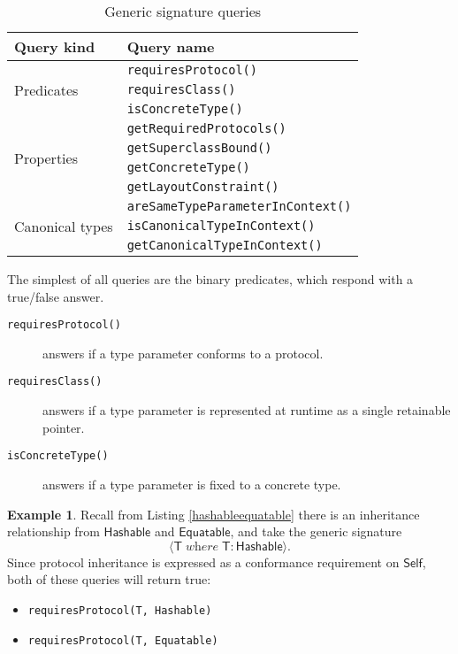 \documentclass[headsepline,bibliography=totoc]{scrreport}
\newcommand{\genericparam}[1]{\bm{\mathsf{#1}}}
\newcommand{\proto}[1]{\bm{\mathsf{#1}}}
\newcommand{\gensig}[2]{\langle #1\;\textit{where}\;#2\rangle}
\theoremstyle{definition}
\newtheorem{example}{Example}[chapter]
\theoremstyle{definition}
\theoremstyle{definition}
\begin{document}
\begin{table}\caption{Generic signature queries}\label{querytable}
\begin{center}
\begin{tabular}{|l|l|}
\hline
Query kind&Query name\\
\hline
\hline
\multirow{3}{7.5em}{Predicates}&\texttt{requiresProtocol()}\\
&\texttt{requiresClass()}\\
&\texttt{isConcreteType()}\\
\hline
\multirow{4}{7.5em}{Properties}&\texttt{getRequiredProtocols()}\\
&\texttt{getSuperclassBound()}\\
&\texttt{getConcreteType()}\\
&\texttt{getLayoutConstraint()}\\
\hline
\multirow{3}{7.5em}{Canonical types}&\texttt{areSameTypeParameterInContext()}\\
&\texttt{isCanonicalTypeInContext()}\\
&\texttt{getCanonicalTypeInContext()}\\
\hline
\end{tabular}
\end{center}
\end{table}

The simplest of all queries are the binary predicates, which respond with a true/false answer.
\begin{description}
\item [\texttt{requiresProtocol()}] answers if a type parameter conforms to a protocol.
\item [\texttt{requiresClass()}] answers if a type parameter is represented at runtime as a single retainable pointer.
\item [\texttt{isConcreteType()}] answers if a type parameter is fixed to a concrete type.
\end{description}

\begin{example}
Recall from Listing \ref{hashableequatable} there is an inheritance relationship from $\proto{Hashable}$ and $\proto{Equatable}$, and take the generic signature
\[\gensig{\genericparam{T}}{\genericparam{T}\colon\proto{Hashable}}.\]
Since protocol inheritance is expressed as a conformance requirement on $\genericparam{Self}$, both of these queries will return true:
\begin{itemize}
\item \texttt{requiresProtocol(T, Hashable)}
\item \texttt{requiresProtocol(T, Equatable)}
\end{itemize}
\end{example}
\end{document}
